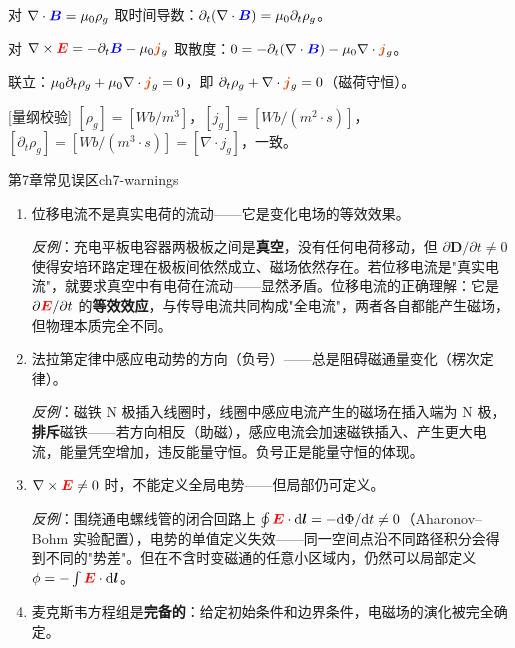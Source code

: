 \documentclass[11pt,a4paper,openany,oneside]{book}
\newcommand{\diff}{\mathrm{d}}
\newcommand{\vecE}{\textcolor{red}{\vect{E}}}
\newcommand{\vecB}{\textcolor{blue}{\vect{B}}}
\newcommand{\vecJ}{\textcolor{cororange}{\vect{j}}}
\newcommand{\vect}[1]{\bm{#1}}
\newcommand{\curl}{\nabla\times}
\newcommand{\divg}{\nabla\cdot}
\begin{document}
对 $\divg\vecB = \mu_0\rho_g$ 取时间导数：$\partial_t(\divg\vecB) = \mu_0\partial_t\rho_g$。

对 $\curl\vecE = -\partial_t\vecB - \mu_0\vecJ_g$ 取散度：$0 = -\partial_t(\divg\vecB) - \mu_0\divg\vecJ_g$。

联立：$\mu_0\partial_t\rho_g + \mu_0\divg\vecJ_g = 0$，即 $\partial_t\rho_g + \divg\vecJ_g = 0$（磁荷守恒）。\qedsymbol

[量纲校验] $[\rho_g] = [Wb/m^3]$，$[j_g] = [Wb/(m^2\cdot s)]$，$[\partial_t\rho_g] = [Wb/(m^3\cdot s)] = [\divg j_g]$，一致。\qedsymbol



\begin{warning}{第7章常见误区}{ch7-warnings}
\begin{enumerate}
\item 位移电流不是真实电荷的流动——它是变化电场的等效效果。

  \textit{反例}：充电平板电容器两极板之间是\textbf{真空}，没有任何电荷移动，但 $\partial\vect{D}/\partial t \neq 0$ 使得安培环路定理在极板间依然成立、磁场依然存在。若位移电流是"真实电流"，就要求真空中有电荷在流动——显然矛盾。位移电流的正确理解：它是 $\partial \vecE/\partial t$ 的\textbf{等效效应}，与传导电流共同构成"全电流"，两者各自都能产生磁场，但物理本质完全不同。

\item 法拉第定律中感应电动势的方向（负号）——总是阻碍磁通量变化（楞次定律）。

  \textit{反例}：磁铁 N 极插入线圈时，线圈中感应电流产生的磁场在插入端为 N 极，\textbf{排斥}磁铁——若方向相反（助磁），感应电流会加速磁铁插入、产生更大电流，能量凭空增加，违反能量守恒。负号正是能量守恒的体现。

\item $\curl\vecE \neq 0$ 时，不能定义全局电势——但局部仍可定义。

  \textit{反例}：围绕通电螺线管的闭合回路上 $\oint\vecE\cdot\diff\vect{l} = -\diff\Phi/\diff t \neq 0$（Aharonov--Bohm 实验配置），电势的单值定义失效——同一空间点沿不同路径积分会得到不同的"势差"。但在不含时变磁通的任意小区域内，仍然可以局部定义 $\phi = -\int\vecE\cdot\diff\vect{l}$。

\item 麦克斯韦方程组是\textbf{完备的}：给定初始条件和边界条件，电磁场的演化被完全确定。
\end{enumerate}
\end{warning}

\end{document}
